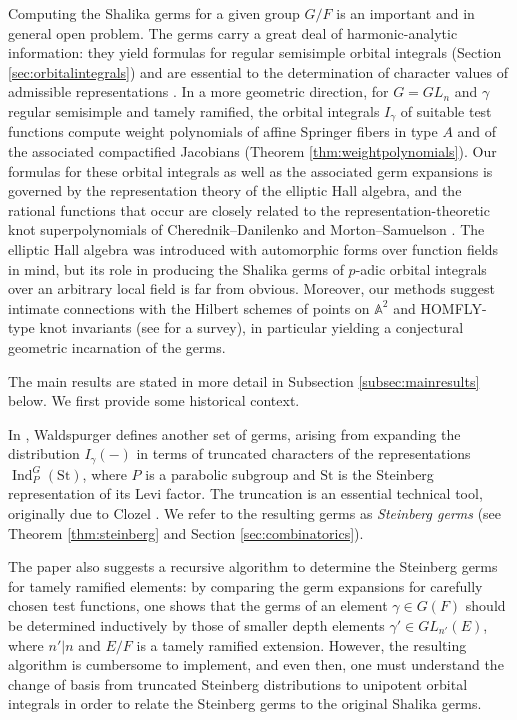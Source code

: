 \documentclass{amsart}
\numberwithin{equation}{section}
\theoremstyle{definition}
\DeclareMathOperator{\Ind}{\mathrm{Ind}}
\newcommand{\A}{\mathbb{A}}
\newcommand{\St}{\mathrm{St}}
\begin{document}
Computing the Shalika germs for a given group $G/F$ is an important and in general open problem. The germs carry a great deal of harmonic-analytic information: they yield formulas for regular semisimple orbital integrals (Section \ref{sec:orbitalintegrals}) and are essential to the determination of character values of admissible representations \cite{Murnaghan, Spice}. In a more geometric direction, for $G=GL_n$ and $\gamma$ regular semisimple and tamely ramified, the orbital integrals $I_\gamma$ of suitable test functions compute weight polynomials of affine Springer fibers in type $A$ and of the associated compactified Jacobians (Theorem \ref{thm:weightpolynomials}).
Our formulas for these orbital integrals as well as the associated germ expansions is governed by the representation theory of the elliptic Hall algebra, and the rational functions that occur are closely related to the representation-theoretic knot superpolynomials of Cherednik--Danilenko \cite{CD} and Morton--Samuelson \cite{MS}. The elliptic Hall algebra \cite{BS1} was introduced with automorphic forms over function fields in mind, but its role in producing the Shalika germs of $p$-adic orbital integrals over an arbitrary local field is far from obvious. Moreover, our methods suggest intimate connections with the Hilbert schemes of points on $\A^2$ and HOMFLY-type knot invariants (see \cite{GKR} for a survey), in particular yielding a conjectural geometric incarnation of the germs.

The main results are stated in more detail in Subsection \ref{subsec:mainresults} below. 
We first provide some historical context. 

In \cite{W2}, Waldspurger defines another set of germs, arising from expanding the distribution $I_\gamma(-)$ in terms of truncated characters of the representations $\Ind_{P}^G(\St)$, where $P$ is a parabolic subgroup and $\St$ is the Steinberg representation of its Levi factor. The truncation is an essential technical tool, originally due to Clozel \cite{C89}. We refer to the resulting germs as {\em Steinberg germs} (see Theorem \ref{thm:steinberg} and Section \ref{sec:combinatorics}).

The paper \cite{W2} also suggests a recursive algorithm to determine the Steinberg germs for tamely ramified elements: 
by comparing the germ expansions for carefully chosen test functions, one shows that the germs of an element $\gamma\in G(F)$ should be determined inductively by those of
smaller depth elements $\gamma'\in GL_{n'}(E)$, where $n'|n$ and $E/F$ is a tamely ramified extension. 
However, the resulting algorithm is cumbersome to implement, and even then, one must understand the change of basis from truncated Steinberg distributions to unipotent orbital integrals in order to relate the Steinberg germs to the original Shalika germs.
\end{document}

